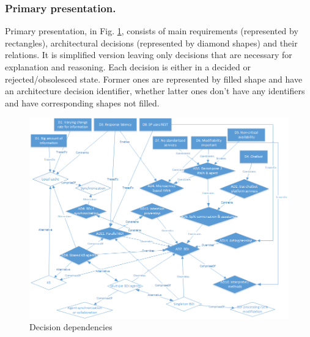 \documentclass{llncs}
\begin{document}
\subsubsection{Primary presentation.}
Primary presentation, in Fig. \ref{fig:decisions}, consists of main requirements (represented by rectangles), architectural decisions (represented by diamond shapes) and their relations. %
It is simplified version leaving only decisions that are necessary for explanation and reasoning. Each decision is either in a decided or rejected/obsolesced state. Former ones are represented by filled shape and have an architecture decision identifier, whether latter ones don't have any identifiers and have corresponding shapes not filled.
\begin{figure}[t]
	\centering
	\includegraphics[width=\linewidth]{Images/decisions.png}
	\caption{Decision dependencies}	
	\label{fig:decisions}
\end{figure}
\end{document}
